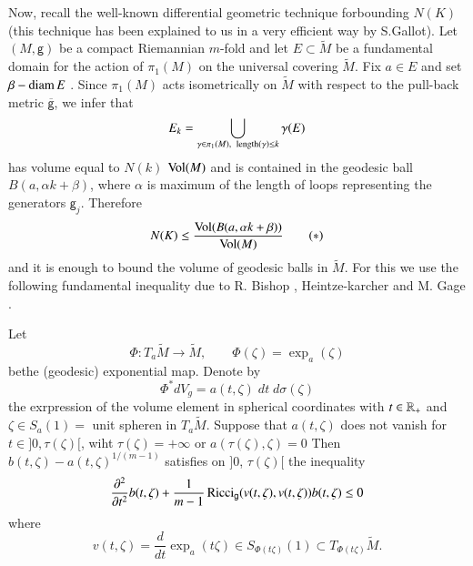 Now, recall the well-known differential geometric technique for\break bounding $N(K)$ (this technique has been explained to us in a very efficient way by S.Gallot). Let $(M, \mathsf{g})$ be a compact Riemannian $m$-fold and let $E\subset \widetilde{M}$ be a fundamental domain for the action of $\pi_{1}(M)$ on the universal covering $\widetilde{M}$. Fix $a\in E$ and set $\beta - \operatorname{diam} E$ . Since $\pi_{1}(M)$ acts isometrically on $\widetilde{M}$ with respect to the pull-back metric $\overline{\mathsf{g}}$, we infer that
$$
E_{k} = \bigcup\limits_{\gamma\in \pi_{1}(M),\;\; \operatorname{length}(\gamma)\leq k} \gamma(E)
$$
has volume equal to $N(k)$ $\operatorname{Vol}(M)$ and is contained in the geodesic ball $B(a, \alpha k + \beta)$, where $\alpha$ is maximum of the length of loops representing the generators $\mathsf{g}_{j}$. Therefore
\begin{equation*}
N(K) \leq \dfrac{\operatorname{Vol}(B(a, \alpha k + \beta))}{\operatorname{Vol}(M)} \tag{$\ast$}\label{eq:sample2}
\end{equation*}
and it is enough to bound the volume of geodesic balls in $\widetilde{M}$. For this we use the following fundamental inequality due to R. Bishop \cite{chap5-keyBi63}, Heintze-karcher \cite{chap5-keyHK78} and M. Gage \cite{chap5-keyGa80}.

\begin{seclem}\label{chap5-lem-2.7}
Let
$$
\Phi : T_{a}\widetilde{M} \rightarrow \widetilde{M},\qquad \Phi(\zeta)= \exp_{a}(\zeta)
$$
be\pageoriginale the (geodesic) exponential map. Denote by
$$
\Phi^{*}dV_{g}= a(t, \zeta)\; dt\; d\sigma(\zeta)
$$
the exrpression of the volume element in spherical coordinates with $t \in \mathbb{R}_{+}$ and $\zeta \in S_{a}(1) =$ unit spheren in $T_{a}\widetilde{M}$. Suppose that $a(t, \zeta)$ does not vanish for $t \in ]0, \tau (\zeta)[$, wiht $\tau(\zeta) = + \infty$ or $a(\tau(\zeta), \zeta) = 0$ Then $b(t, \zeta) - a(t, \zeta)^{1/(m-1)}$ satisfies on $]0$, $\tau(\zeta)[$ the inequality
$$
\dfrac{\partial^{2}}{\partial t^{2}}b(t, \zeta) + \dfrac{1}{m-1}\operatorname{Ricci}_{\mathsf{g}}(v(t, \zeta), v(t, \zeta))b(t, \zeta)\leq 0
$$
where
$$
v(t, \zeta) = \dfrac{d}{dt}\exp_{a}(t\zeta)\in S_{\Phi(t\zeta)}(1) \subset T_{\Phi (t\zeta)}\widetilde{M}.
$$
\end{seclem}

